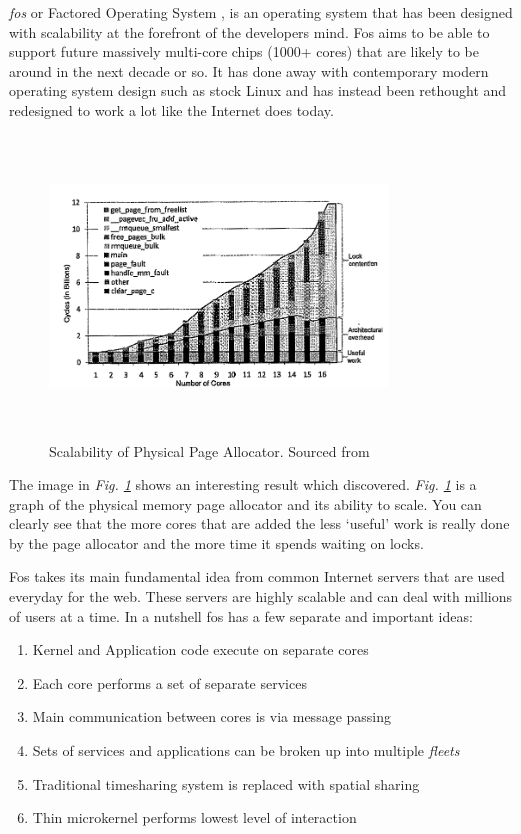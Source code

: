 \documentclass[journal]{IEEEtran}
\begin{document}
\emph{fos} or Factored Operating System \cite{fos}, is an operating system that has been designed with scalability at the forefront of the developers mind. Fos aims to be able to support future massively multi-core chips (1000+ cores) that are likely to be around in the next decade or so. It has done away with contemporary modern operating system design such as stock Linux and has instead been rethought and redesigned to work a lot like the Internet does today.

\begin{figure}
\includegraphics[width =9cm, height =8cm]{page_allocator.png}
\caption{Scalability of Physical Page Allocator. Sourced from \cite{fos}}
\label{PageAllocator}
\end{figure}

The image in \emph{Fig. \ref{PageAllocator}} shows an interesting result which \cite{fos} discovered. \emph{Fig. \ref{PageAllocator}} is a graph of the physical memory page allocator and its ability to scale. You can clearly see that the more cores that are added the less `useful' work is really done by the page allocator and the more time it spends waiting on locks. 

Fos takes its main fundamental idea from common Internet servers that are used everyday for the web. These servers are highly scalable and can deal with millions of users at a time. In a nutshell fos has a few separate and important ideas:

\vspace{2 mm}

\begin{enumerate}
\item Kernel and Application code execute on separate cores
\item Each core performs a set of separate services
\item Main communication between cores is via message passing
\item Sets of services and applications can be broken up into multiple \emph{fleets}
\item Traditional timesharing system is replaced with spatial sharing
\item Thin microkernel performs lowest level of interaction
\end{enumerate}
\end{document}

